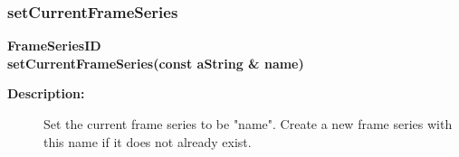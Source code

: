 \subsubsection{setCurrentFrameSeries}
 
\begin{flushleft} \textbf{%
FrameSeriesID  \\ 
\settowidth{\OgshowIncludeArgIndent}{setCurrentFrameSeries(}%
setCurrentFrameSeries(const aString \& name)
}\end{flushleft}
\begin{description}
\item[{\bf Description:}] 
    Set the current frame series to be "name". Create a new frame series with this
  name if it does not already exist.
 
\end{description}
